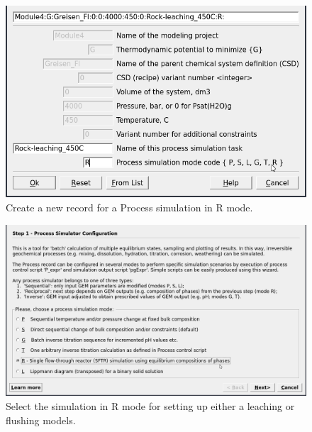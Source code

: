 \documentclass[
]{book}
\begin{document}
\begin{figure}
\includegraphics[width=0.7\linewidth]{figures/module4/fig-4} \caption{Create a new record for a Process simulation in R mode.}\label{fig:fig-4d}
\end{figure}
\begin{figure}
\includegraphics[width=0.9\linewidth]{figures/module4/fig-5} \caption{Select the simulation in R mode for setting up either a leaching or flushing models.}\label{fig:fig-5d}
\end{figure}
\end{document}

